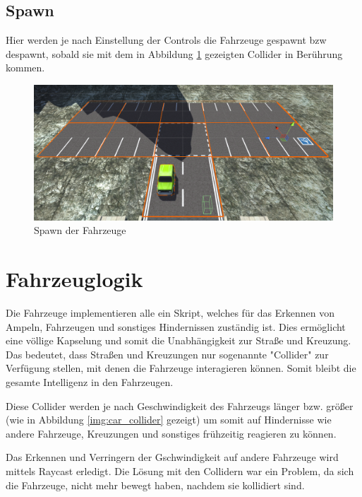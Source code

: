 \subsection{Spawn}

Hier werden je nach Einstellung der Controls die Fahrzeuge gespawnt bzw despawnt, sobald sie mit dem in Abbildung \ref{img:spawn} gezeigten Collider in Berührung kommen.

\begin{figure}[H]
\begin{center}
	\includegraphics[width=1\textwidth]{BilderAllgemein/spawn.png}
\end{center}
	\caption{Spawn der Fahrzeuge}
	\label{img:spawn}
\end{figure}

\section{Fahrzeuglogik}
\label{Fahrzeuglogik}

Die Fahrzeuge implementieren alle ein Skript, welches für das Erkennen von Ampeln, Fahrzeugen und sonstiges Hindernissen zuständig ist. Dies ermöglicht eine völlige Kapselung und somit die Unabhängigkeit zur Straße und Kreuzung. Das bedeutet, dass Straßen und Kreuzungen nur sogenannte "Collider" zur Verfügung stellen, mit denen die Fahrzeuge interagieren können. Somit bleibt die gesamte Intelligenz in den Fahrzeugen.

Diese Collider werden je nach Geschwindigkeit des Fahrzeugs länger bzw. größer (wie in Abbildung \ref{img:car_collider} gezeigt) um somit auf Hindernisse wie andere Fahrzeuge, Kreuzungen und sonstiges frühzeitig reagieren zu können.

Das Erkennen und Verringern der Gschwindigkeit auf andere Fahrzeuge wird mittels Raycast erledigt. Die Lösung mit den Collidern war ein Problem, da sich die Fahrzeuge, nicht mehr bewegt haben, nachdem sie kollidiert sind.

